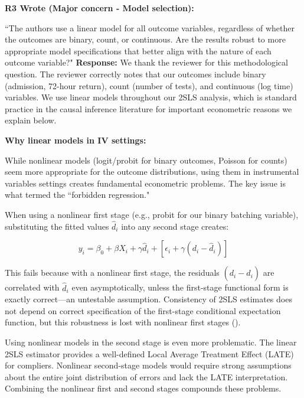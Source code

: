 \documentclass[11pt]{article}
\newenvironment{quote2}
{ \bigskip
\noindent
         \small\em
         \baselineskip=14pt
}
\newcommand{\1}{\hbox{\rm 1\kern-.35em 1}}
\begin{document}
\begin{quote2}
\textbf{R3 Wrote (Major concern -  Model selection):}  

\noindent``The authors use a linear model for all outcome variables, regardless of whether the outcomes are binary, count, or continuous. Are the results robust to more appropriate model specifications that better align with the nature of each outcome variable?"
\end{quote2}



\noindent\textbf{Response:} \color{blue}We thank the reviewer for this methodological question. The reviewer correctly notes that our outcomes include binary (admission, 72-hour return), count (number of tests), and continuous (log time) variables. We use linear models throughout our 2SLS analysis, which is standard practice in the causal inference literature for important econometric reasons we explain below.

\textbf{Why linear models in IV settings:}

While nonlinear models (logit/probit for binary outcomes, Poisson for counts) seem more appropriate for the outcome distributions, using them in instrumental variables settings creates fundamental econometric problems. The key issue is what \cite{hausman1975, Hausman1978} termed the ``forbidden regression."

When using a nonlinear first stage (e.g., probit for our binary batching variable), substituting the fitted values $\hat{d}_i$ into any second stage creates:

$$y_i = \beta_0 + \beta X_i + \gamma \hat{d}_i + [\epsilon_i + \gamma(d_i - \hat{d}_i)]$$

This fails because with a nonlinear first stage, the residuals $(d_i - \hat{d}_i)$ are correlated with $\hat{d}_i$ even asymptotically, unless the first-stage functional form is exactly correct—an untestable assumption. Consistency of 2SLS estimates does not depend on correct specification of the first-stage conditional expectation function, but this robustness is lost with nonlinear first stages (\cite{angrist2009mostly}).

Using nonlinear models in the second stage is even more problematic. The linear 2SLS estimator provides a well-defined Local Average Treatment Effect (LATE) for compliers. Nonlinear second-stage models would require strong assumptions about the entire joint distribution of errors and lack the LATE interpretation. Combining the nonlinear first and second stages compounds these problems.
\end{document}
